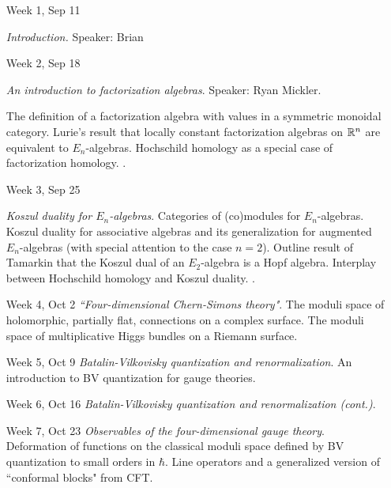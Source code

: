 \documentclass[10pt]{article}
\begin{document}
\begin{itemize}

\item[Week 1, Sep 11]

{\em Introduction.} Speaker: Brian 

\item[Week 2, Sep 18] 

{\em An introduction to factorization algebras}. Speaker: Ryan Mickler.

The definition of a factorization algebra with values in a symmetric monoidal category.
Lurie's result that locally constant factorization algebras on $\mathbb R^n$ are equivalent to $E_n$-algebras. 
Hochschild homology as a special case of factorization homology.
\cite{CG1, LurieHA, AFTopMan}.


\item[Week 3, Sep 25]

{\em Koszul duality for $E_n$-algebras}.
Categories of (co)modules for $E_n$-algebras.
Koszul duality for associative algebras and its generalization for augmented $E_n$-algebras (with special attention to the case $n=2$).
Outline result of Tamarkin that the Koszul dual of an $E_2$-algebra is a Hopf algebra. 
Interplay between Hochschild homology and Koszul duality.
\cite{CosYangian, Tamarkin}.


\item[Week 4, Oct 2] {\em ``Four-dimensional Chern-Simons theory"}.
The moduli space of holomorphic, partially flat, connections on a complex surface.
The moduli space of multiplicative Higgs bundles on a Riemann surface.


\item[Week 5, Oct 9] {\em Batalin-Vilkovisky quantization and renormalization}.
An introduction to BV quantization for gauge theories.


\item[Week 6, Oct 16] {\em Batalin-Vilkovisky quantization and renormalization (cont.)}.

\item[Week 7, Oct 23] {\em Observables of the four-dimensional gauge theory}.
Deformation of functions on the classical moduli space defined by BV quantization to small orders in $\hbar$. 
Line operators and a generalized version of ``conformal blocks" from CFT. 
\cite{CosBook, CG2, CosYangian}


\end{itemize}
\end{document}
